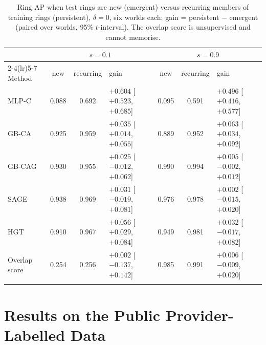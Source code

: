 \documentclass[pdflatex,sn-vancouver-num]{sn-jnl}
\begin{document}
\begin{table}[h]
\caption{Ring AP when test rings are new (emergent) versus recurring members of training rings (persistent), $\delta=0$, six worlds each; gain = persistent $-$ emergent (paired over worlds, 95\% $t$-interval). The overlap score is unsupervised and cannot memorise.}\label{tab:protocol}
\scriptsize
\setlength{\tabcolsep}{3pt}
\begin{tabular}{@{}lccp{2.2cm}ccp{2.2cm}@{}}
\toprule
 & \multicolumn{3}{c}{$s=0.1$} & \multicolumn{3}{c}{$s=0.9$} \\
\cmidrule(lr){2-4}\cmidrule(lr){5-7}
Method & new & recurring & gain & new & recurring & gain \\
\midrule
MLP-C & 0.088 & 0.692 & $+0.604$ [$+0.523$, $+0.685$] & 0.095 & 0.591 & $+0.496$ [$+0.416$, $+0.577$] \\
GB-CA & 0.925 & 0.959 & $+0.035$ [$+0.014$, $+0.055$] & 0.889 & 0.952 & $+0.063$ [$+0.034$, $+0.092$] \\
GB-CAG & 0.930 & 0.955 & $+0.025$ [$-0.012$, $+0.062$] & 0.990 & 0.994 & $+0.005$ [$-0.002$, $+0.012$] \\
SAGE & 0.938 & 0.969 & $+0.031$ [$-0.019$, $+0.081$] & 0.976 & 0.978 & $+0.002$ [$-0.015$, $+0.020$] \\
HGT & 0.910 & 0.967 & $+0.056$ [$+0.029$, $+0.084$] & 0.949 & 0.981 & $+0.032$ [$-0.017$, $+0.082$] \\
Overlap score & 0.254 & 0.256 & $+0.002$ [$-0.137$, $+0.142$] & 0.985 & 0.991 & $+0.006$ [$-0.009$, $+0.020$] \\
\botrule
\end{tabular}
\end{table}

\section{Results on the Public Provider-Labelled Data}\label{sec:realresults}
\end{document}

